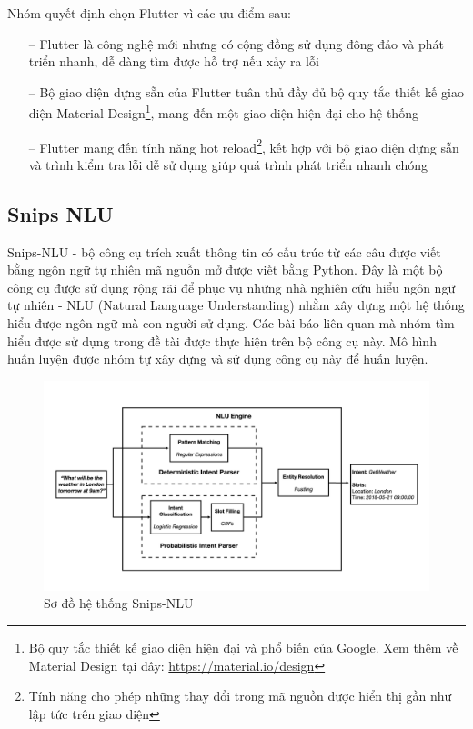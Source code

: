 Nhóm quyết định chọn Flutter vì các ưu điểm sau:
\begin{itemize}
    \item[--] Flutter là công nghệ mới nhưng có cộng đồng sử dụng đông đảo và phát triển nhanh, dễ dàng tìm được hỗ trợ nếu xảy ra lỗi
    \item[--] Bộ giao diện dựng sẵn của Flutter tuân thủ đầy đủ bộ quy tắc thiết kế giao diện Material Design\footnote{Bộ quy tắc thiết kế giao diện hiện đại và phổ biến của Google. Xem thêm về Material Design tại đây: \url{https://material.io/design}}, mang đến một giao diện hiện đại cho hệ thống
    \item[--] Flutter mang đến tính năng hot reload\footnote{Tính năng cho phép những thay đổi trong mã nguồn được hiển thị gần như lập tức trên giao diện}, kết hợp với bộ giao diện dựng sẵn và trình kiểm tra lỗi dễ sử dụng giúp quá trình phát triển nhanh chóng
\end{itemize}

\subsection{Snips NLU}
Snips-NLU - bộ công cụ trích xuất thông tin có cấu trúc từ các câu được viết bằng ngôn ngữ tự nhiên mã nguồn mở được viết bằng Python.
Đây là một bộ công cụ được sử dụng rộng rãi để phục vụ những nhà nghiên cứu hiểu ngôn ngữ tự nhiên - NLU (Natural Language Understanding) nhằm xây dựng một hệ thống hiểu được ngôn ngữ mà con người sử dụng. Các bài báo liên quan mà nhóm tìm hiểu được sử dụng trong đề tài được thực hiện trên bộ công cụ này. Mô hình huấn luyện được nhóm tự xây dựng và sử dụng công cụ này để huấn luyện.

\begin{figure}[htp]
    \centering
    \includegraphics[width=15cm]{images/Snips-NLU.png}
    \caption{Sơ đồ hệ thống Snips-NLU}
    \label{fig:snips-nlu}
\end{figure}


